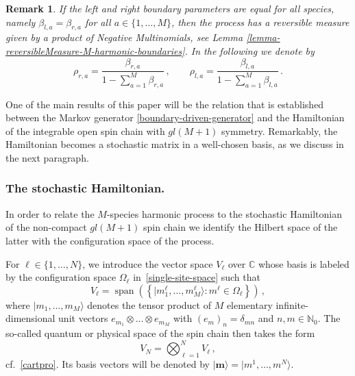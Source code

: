 \documentclass[11pt]{article}
\numberwithin{equation}{section}
\newtheorem{remark}[theorem]{Remark}
\newcommand{\M}{M}
\newcommand{\N}{N}
\DeclareMathOperator{\spa}{span}
\begin{document}
\begin{remark}
    If the left and right boundary parameters are equal for all species, namely $\beta_{l,a}=\beta_{r,a}$ for all $a\in \{1,\ldots, \M\}$, then the process has a reversible measure given by a product of Negative Multinomials, see Lemma \ref{lemma-reversibleMeasure-M-harmonic-boundaries}. 
    In the following we denote by 
\begin{equation}\label{rhos}
 \rho_{r,a}=\frac{\beta_{r,a}}{1-\sum_{a=1}^{\M}\beta_{r,a}}\,,\qquad 
 \rho_{l,a}=\frac{\beta_{l,a}}{1-\sum_{a=1}^{\M}\beta_{l,a}}\,.
\end{equation}
\end{remark}

One of the main results of this paper will be the relation that
is established between
the Markov generator \eqref{boundary-driven-generator} and the
Hamiltonian of the integrable open spin chain with $gl(M+1)$
symmetry. Remarkably, the Hamiltonian becomes a stochastic matrix in a well-chosen basis,
as we discuss in the next paragraph.

\subsubsection{The stochastic Hamiltonian.}
In order to relate the $M$-species harmonic process to the stochastic Hamiltonian of the non-compact  $gl(M+1)$ spin chain we identify the Hilbert space of the latter with the configuration space of the process.

For $\ell\in \{1,\ldots,N\}$, we introduce the  vector space $V_\ell$ over $\mathbb{C}$ whose basis is labeled by the configuration space $\Omega_\ell$ in~\eqref{single-site-space} such that
\begin{equation}\label{basis}
    V_\ell =\spa\left(\left\{|m_1^\ell,\ldots, m_M^\ell\rangle :m^\ell\in\Omega_\ell\right\}\right)\,,
\end{equation}
where $|{m_1,\ldots, m_M}\rangle$ denotes the tensor product of $M$ elementary infinite-dimensional unit vectors $e_{m_1}\otimes\ldots\otimes e_{m_M}$ with $(e_m)_{n}=\delta_{mn}$ and $n,m\in \mathbb{N}_0$. The so-called quantum or physical space of the spin chain then takes the form
\begin{equation}
 V_{\N}=\bigotimes_{\ell=1}^N V_{\ell}\,,
\end{equation}
cf.~\eqref{cartpro}. Its basis vectors will be denoted by $|\bm{m}\rangle=|m^1,\ldots,m^N\rangle$. 
\end{document}
